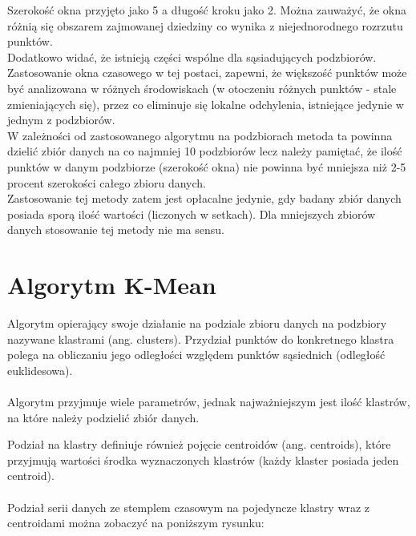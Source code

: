 \documentclass[eng,printmode]{mgr}
\begin{document}
Szerokość okna przyjęto jako 5 a długość kroku jako 2. Można zauważyć, że okna różnią się obszarem zajmowanej dziedziny co wynika z niejednorodnego rozrzutu punktów.
\\
Dodatkowo widać, że istnieją części wspólne dla sąsiadujących podzbiorów. Zastosowanie okna czasowego w tej postaci, zapewni, że większość punktów może być analizowana w różnych środowiskach (w otoczeniu różnych punktów - stale zmieniających się), przez co eliminuje się lokalne odchylenia, istniejące jedynie w jednym z podzbiorów.
\\
W zależności od zastosowanego algorytmu na podzbiorach metoda ta powinna dzielić zbiór danych na co najmniej 10 podzbiorów lecz należy pamiętać, że ilość punktów w danym podzbiorze (szerokość okna) nie powinna być mniejsza niż 2-5 procent szerokości całego zbioru danych.
\\
Zastosowanie tej metody zatem jest opłacalne jedynie, gdy badany zbiór danych posiada sporą ilość wartości (liczonych w setkach). Dla mniejszych zbiorów danych stosowanie tej metody nie ma sensu. 

\section{Algorytm K-Mean}
Algorytm opierający swoje działanie na podziale zbioru danych na podzbiory nazywane klastrami (ang. clusters). Przydział punktów do konkretnego klastra polega na obliczaniu jego odległości względem punktów sąsiednich (odległość euklidesowa). \\ \\
Algorytm przyjmuje wiele parametrów, jednak najważniejszym jest ilość klastrów, na które należy podzielić zbiór danych.

Podział na klastry definiuje również pojęcie centroidów (ang. centroids), które przyjmują wartości środka wyznaczonych klastrów (każdy klaster posiada jeden centroid). \\ \\

Podział serii danych ze stemplem czasowym na pojedyncze klastry wraz z centroidami można zobaczyć na poniższym rysunku:
\end{document}
